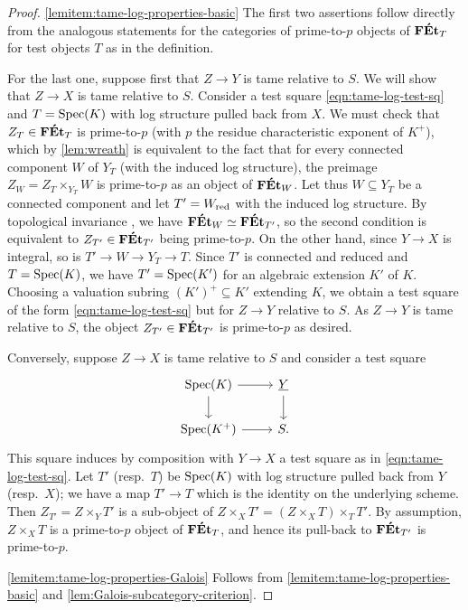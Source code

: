 \begin{proof}
\ref{lemitem:tame-log-properties-basic} The first two assertions follow directly from the analogous statements for the categories of prime-to-$p$ objects of $\mathbf{F\acute{E}t}_T$ for test objects $T$ as in the definition. 

For the last one, suppose first that $Z\to Y$ is tame relative to $S$. We will show that $Z\to X$ is tame relative to $S$. Consider a test square \eqref{eqn:tame-log-test-sq} and $T=\operatorname{Spec}(K)$ with log structure pulled back from $X$. We must check that $Z_T\in \mathbf{F\acute{E}t}_T$ is prime-to-$p$ (with $p$ the residue characteristic exponent of $K^+$), which by \cref{lem:wreath} is equivalent to the fact that for every connected component $W$ of $Y_T$ (with the induced log structure), the preimage $Z_W = Z_T\times_{Y_T} W$ is prime-to-$p$ as an object of $\mathbf{F\acute{E}t}_W$. Let thus $W\subseteq Y_T$ be a connected component and let $T'=W_{\rm red}$ with the induced log structure. By topological invariance \cite[Proposition~4.2.4(d)]{AHLS-Log}, we have $\mathbf{F\acute{E}t}_W \simeq \mathbf{F\acute{E}t}_{T'}$, so the second condition is equivalent to $Z_{T'}\in\mathbf{F\acute{E}t}_{T'}$ being prime-to-$p$. On the other hand, since $Y\to X$ is integral, so is $T'\to W\to Y_T\to T$. Since $T'$ is connected and reduced and $T=\operatorname{Spec}(K)$, we have $T'=\operatorname{Spec}(K')$ for an algebraic extension $K'$ of $K$. Choosing a valuation subring $(K')^+\subseteq K'$ extending $K$, we obtain a test square of the form \eqref{eqn:tame-log-test-sq} but for $Z\to Y$ relative to $S$. As $Z\to Y$ is tame relative to $S$, the object $Z_{T'}\in \mathbf{F\acute{E}t}_{T'}$ is prime-to-$p$ as desired.

Conversely, suppose $Z\to X$ is tame relative to $S$ and consider a test square 
\[
    \begin{tikzcd}
        \Spec(K)\ar[r] \ar[d] & \underline{Y}\ar[d] \\
        \Spec(K^+) \ar[r] & S.
    \end{tikzcd}
\]
This square induces by composition with $Y\to X$ a test square as in \eqref{eqn:tame-log-test-sq}. Let $T'$ (resp.\ $T$) be $\operatorname{Spec}(K)$ with log structure pulled back from $Y$ (resp.\ $X$); we have a map $T'\to T$ which is the identity on the underlying scheme. Then $Z_{T'}=Z\times_{Y} T'$ is a sub-object of $Z\times_X T' = (Z\times_X T)\times_T T'$. By assumption, $Z\times_X T$ is a prime-to-$p$ object of $\mathbf{F\acute{E}t}_T$, and hence its pull-back to $\mathbf{F\acute{E}t}_{T'}$ is prime-to-$p$.

\ref{lemitem:tame-log-properties-Galois} 
Follows from \ref{lemitem:tame-log-properties-basic} and \cref{lem:Galois-subcategory-criterion}.


\end{proof}
